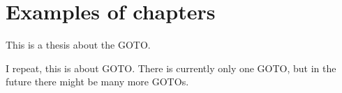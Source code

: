 
\chapter{Examples of chapters}
\label{c:examples}
\newpage


This is a thesis about the \ac{GOTO}.

I repeat, this is about \ac{GOTO}. There is currently only one \ac{GOTO}, but in the future there might be many more \ac{GOTO}s.

\lipsum[1-5] %
